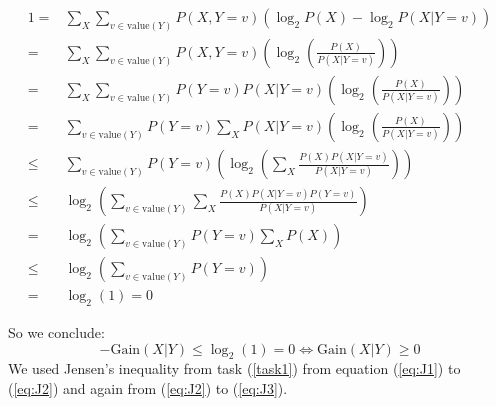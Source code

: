 \documentclass[10pt,a4paper,boxed]{hmcpset}
\begin{document}
\begin{solution}
\begin{enumerate}[(i)]
		\begin{alignat}{1}
												   = & \sum_{X}\sum_{v\in\mathrm{value}(Y)}P\left(X,Y=v\right)\left(\log_{2}P\left(X\right)-\log_{2}P\left(X\vert Y=v\right)\right) \nonumber\\
												   = & \sum_{X}\sum_{v\in\mathrm{value}(Y)}P\left(X,Y=v\right)\left(\log_{2}\left(\frac{P\left(X\right)}{P\left(X\vert Y=v\right)}\right)\right)\nonumber\\
												   = & \sum_{X}\sum_{v\in\mathrm{value}(Y)}P(Y=v)P\left(X|Y=v\right)\left(\log_{2}\left(\frac{P\left(X\right)}{P\left(X\vert Y=v\right)}\right)\right)\nonumber\\
												   = & \sum_{v\in\mathrm{value}(Y)}P(Y=v)\sum_{X}P\left(X|Y=v\right)\left(\log_{2}\left(\frac{P\left(X\right)}{P\left(X\vert Y=v\right)}\right)\right)\label{eq:J1}\\
												\leq & \sum_{v\in\mathrm{value}(Y)}P(Y=v)\left(\log_{2}\left(\sum_{X}\frac{P\left(X\right)P\left(X|Y=v\right)}{P\left(X\vert Y=v\right)}\right)\right)\label{eq:J2}\\
												\leq & \log_{2}\left(\sum_{v\in\mathrm{value}(Y)}\sum_{X}\frac{P\left(X\right)P\left(X|Y=v\right)P(Y=v)}{P\left(X\vert Y=v\right)}\right)\label{eq:J3}\\
												   = & \log_{2}\left(\sum_{v\in\mathrm{value}(Y)}P(Y=v)\sum_{X}P\left(X\right)\right)\nonumber \\
 												\leq & \log_{2}\left(\sum_{v\in\mathrm{value}(Y)}P(Y=v)\right)\nonumber\\
												   = & \log_{2}\left(1\right)=0 \nonumber
		\end{alignat}
		
		So we conclude: \[ \mathrm{-Gain}\left(X\vert Y\right) \leq \log_{2}\left(1\right) = 0 \Leftrightarrow \mathrm{Gain}\left(X\vert Y\right) \geq 0 \]
		We used Jensen's inequality from task (\ref{task1}) from equation (\ref{eq:J1}) to (\ref{eq:J2}) and again from (\ref{eq:J2}) to (\ref{eq:J3}).

	\end{enumerate}
	
\end{solution}
\end{document}
